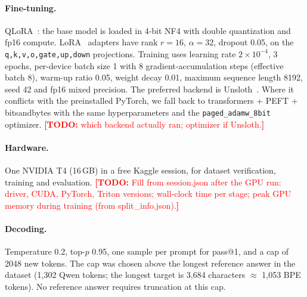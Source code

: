 \documentclass[11pt]{article}
\newcommand{\todo}[1]{\textcolor{red}{\textbf{[TODO:} #1\textbf{]}}}
\newcommand{\code}[1]{\texttt{#1}}
\begin{document}
\paragraph{Fine-tuning.} QLoRA~\cite{dettmers2023qlora}: the base model is loaded in 4-bit NF4 with
double quantization and fp16 compute. LoRA~\cite{hu2022lora} adapters have rank $r=16$,
$\alpha=32$, dropout 0.05, on the \code{q,k,v,o,gate,up,down} projections. Training uses
learning rate $2\times10^{-4}$, 3 epochs, per-device batch size 1 with 8 gradient-accumulation
steps (effective batch 8), warm-up ratio 0.05, weight decay 0.01, maximum sequence length 8192,
seed 42 and fp16 mixed precision. %
The preferred backend is Unsloth~\cite{unsloth2023}. Where it conflicts with the preinstalled
PyTorch, we fall back to transformers + PEFT + bitsandbytes with the same hyperparameters and the
\code{paged\_adamw\_8bit} optimizer. \todo{which backend actually ran; optimizer if Unsloth.}

\paragraph{Hardware.} One NVIDIA T4 (16\,GB) in a free Kaggle session, for dataset verification,
training and evaluation. \todo{Fill from session.json after the GPU run: driver, CUDA, PyTorch,
Triton versions; wall-clock time per stage; peak GPU memory during training (from split\_info.json).}

\paragraph{Decoding.} Temperature 0.2, top-$p$ 0.95, one sample per prompt for pass@1, and a cap
of 2048 new tokens. %
The cap was chosen above the longest reference answer in the dataset (1,302 Qwen tokens; the
longest target is 3,684 characters $\approx$ 1,053 BPE tokens). %
No reference answer requires truncation at this cap.
\end{document}
